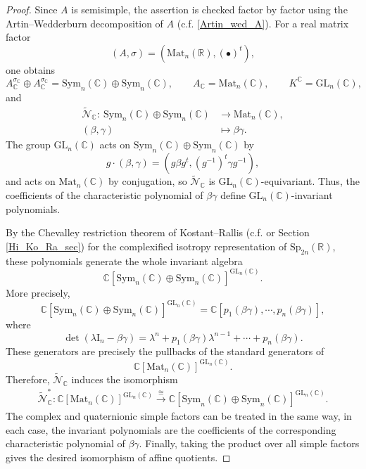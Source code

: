 \documentclass[oneside,11pt]{amsart}
\theoremstyle{definition}
\theoremstyle{remark}
\numberwithin{thm}{section}
\numberwithin{equation}{section}
\begin{document}
\begin{proof}
Since $A$ is semisimple, the assertion is checked factor by factor using the Artin--Wedderburn decomposition of $A$ (c.f. \eqref{Artin_wed_A}). For a real matrix factor
\[
(A,\sigma)=({\mathrm{Mat}}_n(\mathbb R),(\bullet)^t),
\]
one obtains
\[
A_{\mathbb{C}}^{\sigma_{\mathbb{C}}}\oplus A_{\mathbb{C}}^{\sigma_{\mathbb{C}}}={\mathrm{Sym}}_n(\mathbb{C})\oplus{\mathrm{Sym}}_n(\mathbb{C}),\qquad A_{\mathbb{C}}={\mathrm{Mat}}_n(\mathbb{C}),\qquad K^{\mathbb{C}}={\mathrm{GL}}_n(\mathbb{C}),
\]
and 
\begin{align*}
    \tilde{\mathcal{N}}_{\mathbb{C}}:\ {\mathrm{Sym}}_n(\mathbb{C})\oplus{\mathrm{Sym}}_n(\mathbb{C})&\longrightarrow{\mathrm{Mat}}_n(\mathbb{C}),\\
    (\beta,\gamma)&\longmapsto\beta\gamma.
\end{align*}
The group ${\mathrm{GL}}_n(\mathbb{C})$ acts on ${\mathrm{Sym}}_n(\mathbb{C})\oplus{\mathrm{Sym}}_n(\mathbb{C})$ by
\[
g\cdot(\beta,\gamma)=(g\beta g^t,(g^{-1})^t\gamma g^{-1}),
\]
and acts on ${\mathrm{Mat}}_n(\mathbb{C})$ by conjugation, so $\tilde{\mathcal{N}}_{\mathbb{C}}$ is ${\mathrm{GL}}_n(\mathbb{C})$-equivariant. Thus, the coefficients of the characteristic polynomial of $\beta\gamma$ define ${\mathrm{GL}}_n(\mathbb{C})$-invariant polynomials.

By the Chevalley restriction theorem of Kostant--Rallis (c.f. \cite{KR71} or Section \ref{Hi_Ko_Ra_sec}) for the complexified isotropy representation of $\mathrm{Sp}_{2n}(\mathbb R)$, these polynomials  generate the whole invariant algebra
\[
\mathbb{C}[{\mathrm{Sym}}_n(\mathbb{C})\oplus{\mathrm{Sym}}_n(\mathbb{C})]^{{\mathrm{GL}}_n(\mathbb{C})}.
\]
More precisely,
\[
\mathbb{C}[{\mathrm{Sym}}_n(\mathbb{C})\oplus{\mathrm{Sym}}_n(\mathbb{C})]^{{\mathrm{GL}}_n(\mathbb{C})}=\mathbb{C}[p_1(\beta\gamma),\cdots,p_n(\beta\gamma)],
\]
where 
\[
\det(\lambda\mathrm{I}_n-\beta\gamma)=\lambda^n+p_1(\beta\gamma)\lambda^{n-1}+\cdots+p_n(\beta\gamma).
\]
These generators are precisely the pullbacks of the standard generators of
\[
\mathbb{C}[{\mathrm{Mat}}_n(\mathbb{C})]^{{\mathrm{GL}}_n(\mathbb{C})}.
\]
Therefore, $\tilde{\mathcal{N}}_{\mathbb{C}}$ induces the isomorphism 
\begin{align*}
    \tilde{\mathcal{N}}_{\mathbb{C}}^*: \mathbb{C}[{\mathrm{Mat}}_n(\mathbb{C})]^{{\mathrm{GL}}_n(\mathbb{C})}\xrightarrow{\cong}\mathbb{C}[{\mathrm{Sym}}_n(\mathbb{C})\oplus{\mathrm{Sym}}_n(\mathbb{C})]^{{\mathrm{GL}}_n(\mathbb{C})}.
\end{align*}
The complex and quaternionic simple factors can be treated in the same way, in each case, the invariant polynomials are the coefficients of the corresponding characteristic polynomial of $\beta\gamma$. Finally, taking the product over all simple factors gives the desired isomorphism of affine quotients.
\end{proof}
\end{document}
